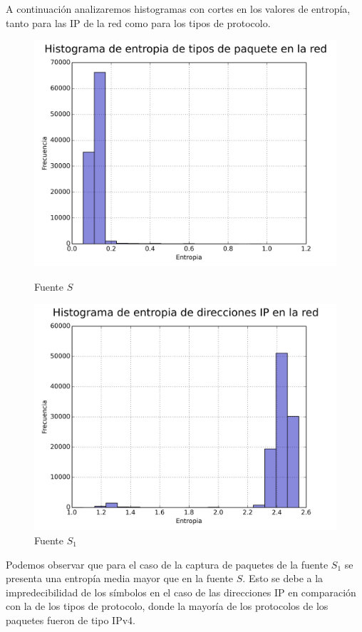 A continuación analizaremos histogramas con cortes en los valores de entropía, tanto para las IP de la red como para los tipos de protocolo.

\begin{figure}[ht!]
  \centering
  \begin{minipage}[b]{0.48\textwidth}
    \includegraphics[width=\textwidth]{graficos/red_domestica_hist_type.png}
    \caption{Fuente $S$}
    \label{fig:red_domestica_hist_type}
  \end{minipage}
  \hfill
  \begin{minipage}[b]{0.48\textwidth}
    \includegraphics[width=\textwidth]{graficos/red_domestica_hist_arp.png}
    \caption{Fuente $S_1$}
    \label{fig:red_domestica_hist_arp}
  \end{minipage}
\end{figure}

Podemos observar que para el caso de la captura de paquetes de la fuente $S_1$ se presenta una entropía media mayor que en la fuente $S$. Esto se debe a la impredecibilidad de los símbolos en el caso de las direcciones IP en comparación con la de los tipos de protocolo, donde la mayoría de los protocolos de los paquetes fueron de tipo IPv4.